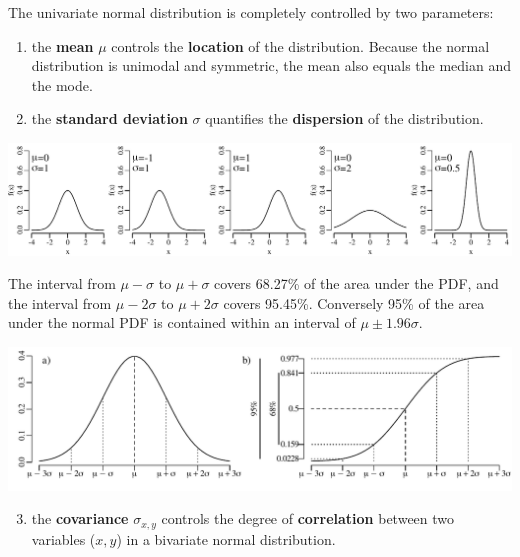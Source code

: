 The univariate normal distribution is completely controlled by two
parameters:

\begin{enumerate}
\item the \textbf{mean} $\mu$ controls the \textbf{location} of the
  distribution.  Because the normal distribution is unimodal and
  symmetric, the mean also equals the median and the mode.
\item the \textbf{standard deviation} $\sigma$ quantifies the
  \textbf{dispersion} of the distribution.
\end{enumerate}

\noindent\includegraphics[width=\textwidth]{../figures/musigma.pdf}
\begingroup {}
\label{fig:musigma}
\endgroup

The interval from $\mu-\sigma$ to $\mu+\sigma$ covers 68.27\% of the
area under the PDF, and the interval from $\mu-2\sigma$ to
$\mu+2\sigma$ covers 95.45\%. Conversely 95\% of the area under the
normal PDF is contained within an interval of $\mu\pm{1.96}\sigma$.

\noindent\includegraphics[width=\textwidth]{../figures/2sigma.pdf}
\begingroup {}
\label{fig:2sigma}
\endgroup

\begin{enumerate}
  \setcounter{enumi}{2}
\item the \textbf{covariance} $\sigma_{x,y}$ controls the degree of
  \textbf{correlation} between two variables ($x,y$) in a bivariate
  normal distribution.
\end{enumerate}

